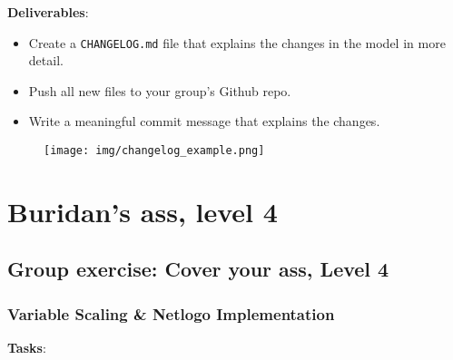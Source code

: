 \documentclass[
  letterpaper,
  DIV=11,
  numbers=noendperiod]{scrartcl}
\providecommand{\tightlist}{%
  \setlength{\itemsep}{0pt}\setlength{\parskip}{0pt}}\usepackage{longtable,booktabs,array}
\begin{document}
\textbf{Deliverables}:

\begin{itemize}
\tightlist
\item
  Create a \texttt{CHANGELOG.md} file that explains the changes in the
  model in more detail.
\item
  Push all new files to your group's Github repo.
\item
  Write a meaningful commit message that explains the changes.
\end{itemize}

\begin{figure}

{\centering \texttt{[image: img/changelog\_example.png]}

}

\end{figure}

\hypertarget{buridans-ass-level-4}{%
\section{Buridan's ass, level 4}\label{buridans-ass-level-4}}

\hypertarget{fa-people-group-size1x-group-exercise-cover-your-ass-level-4}{%
\subsection{\texorpdfstring{{ Group exercise: Cover
your ass, Level
4}}{ Group exercise: Cover your ass, Level 4}}\label{fa-people-group-size1x-group-exercise-cover-your-ass-level-4}}

\hypertarget{variable-scaling-netlogo-implementation}{%
\subsubsection{Variable Scaling \& Netlogo
Implementation}\label{variable-scaling-netlogo-implementation}}

\textbf{Tasks}:
\end{document}
